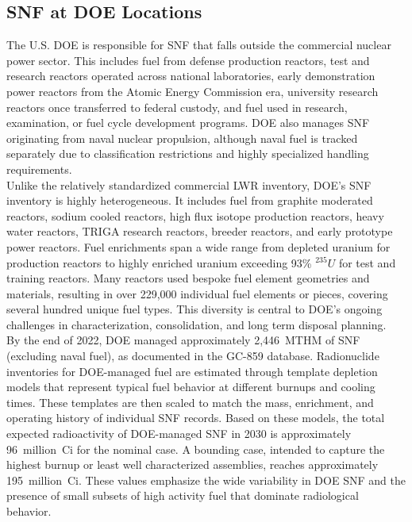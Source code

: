 \subsection{\gls{SNF} at \gls{DOE} Locations}

    The U.S. \gls{DOE} is responsible for \gls{SNF} that falls outside the
    commercial nuclear power sector. This includes fuel from defense production reactors, test and research reactors operated
    across national laboratories, early demonstration power reactors from the Atomic Energy Commission era, university research
    reactors once transferred to federal custody, and fuel used in research, examination, or fuel cycle development programs.
    \gls{DOE} also manages \gls{SNF} originating from naval nuclear propulsion, although naval fuel is tracked separately due to classification
    restrictions and highly specialized handling requirements.\\

    Unlike the relatively standardized commercial \gls{LWR} inventory, \gls{DOE}'s \gls{SNF} inventory is highly heterogeneous.
    It includes fuel from graphite moderated reactors, sodium cooled reactors, high flux isotope production reactors,
    heavy water reactors, TRIGA 
    research reactors, breeder reactors, and early prototype power reactors. Fuel enrichments
    span a wide range from depleted uranium for production reactors to highly enriched uranium exceeding 93\% $^{235}U$ for
    test and training reactors. Many reactors used bespoke fuel element geometries and materials, resulting in over 229,000
    individual fuel elements or pieces, covering several hundred unique fuel types. This diversity is central to \gls{DOE}'s ongoing
    challenges in characterization, consolidation, and long term disposal planning.\\

     By the end of 2022, \gls{DOE} managed approximately 2,446~MTHM
     of \gls{SNF} (excluding naval fuel), as documented in the GC-859 database.
     Radionuclide inventories for \gls{DOE}-managed fuel are estimated through template depletion models that represent typical fuel
    behavior at different burnups and cooling times. These templates are then scaled to match the mass, enrichment, and operating
    history of individual \gls{SNF} records. Based on these models, the total 
    expected radioactivity of \gls{DOE}-managed \gls{SNF} in 2030 is
    approximately 96~million~Ci for the nominal case. A bounding case, intended to capture the highest burnup or least
    well characterized assemblies, reaches approximately 195~million~Ci. These values emphasize the wide variability in \gls{DOE} \gls{SNF}
    and the presence of small subsets of high activity fuel that dominate radiological behavior.\\

